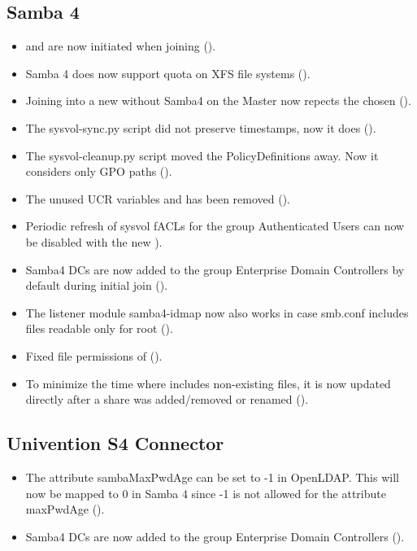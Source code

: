\subsection{Samba 4}
\begin{itemize}
\item {} and  are now initiated when joining  ().
\item Samba 4 does now support quota on XFS file systems ().
\item Joining into a new  without Samba4 on the Master now repects the chosen  ().
\item The sysvol-sync.py script did not preserve timestamps, now it does ().
\item The sysvol-cleanup.py script moved the PolicyDefinitions away. Now it considers only GPO paths ().
\item The unused UCR variables  and  has been removed ().
\item Periodic refresh of sysvol fACLs for the group Authenticated Users can
now be disabled with the new  ).
\item Samba4 DCs are now added to the group Enterprise Domain Controllers
by default during initial join ().
\item The listener module samba4-idmap now also works in case smb.conf includes files readable
only for root ().
\item Fixed file permissions of  ().
\item To minimize the time where  includes non-existing files, it is now updated directly after a share was added/removed or renamed ().
\end{itemize}

\subsection{Univention S4 Connector}
\begin{itemize}
\item The attribute sambaMaxPwdAge can be set to -1 in OpenLDAP. This will
  now be mapped to 0 in Samba 4 since -1 is not allowed for the attribute
  maxPwdAge ().
\item Samba4 DCs are now added to the group Enterprise Domain Controllers ().
\end{itemize}

